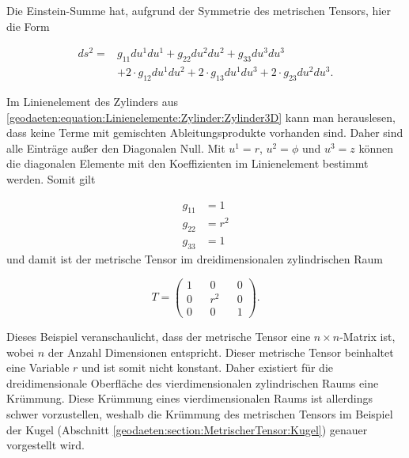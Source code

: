 Die Einstein-Summe hat, aufgrund der Symmetrie des metrischen Tensors, hier die Form

\begin{equation}
\begin{aligned}
	ds^2 = &g_{11}  du^1  du^1 + g_{22}  du^2  du^2 + g_{33}  du^3  du^3 \nonumber \\
	&+ 2 \cdot g_{12}  du^1  du^2 + 2 \cdot g_{13}  du^1  du^3 + 2 \cdot g_{23}  du^2  du^3 .
\end{aligned} 
	\label{geodaeten:equation:MetrischerTensor:Kartesisch:EinsteinSumme3D}
\end{equation}

Im Linienelement des Zylinders aus \eqref{geodaeten:equation:Linienelemente:Zylinder:Zylinder3D} kann man herauslesen, dass keine Terme mit gemischten Ableitungsprodukte vorhanden sind.
Daher sind alle Einträge außer den Diagonalen Null.
Mit $u^1 = r$, $u^2 = \phi$ und $u^3 = z$  können die diagonalen Elemente mit den Koeffizienten im Linienelement bestimmt werden. 
Somit gilt

\begin{equation}
	\begin{aligned}
		g_{11}  &= 1  \\
		g_{22}  &= r^2 \\
		g_{33}  &= 1  
	\end{aligned}
\end{equation}
und damit ist der metrische Tensor im dreidimensionalen zylindrischen Raum

\begin{equation}
	T = \begin{pmatrix} 1 && 0 && 0 \\ 0 && r^2 && 0 \\ 0 && 0 && 1 \end{pmatrix} .
\end{equation}

Dieses Beispiel veranschaulicht, dass der metrische Tensor eine $n \times n$-Matrix ist, wobei $n$ der Anzahl Dimensionen entspricht.
Dieser metrische Tensor beinhaltet eine Variable $r$ und ist somit nicht konstant. 
Daher existiert für die dreidimensionale Oberfläche des vierdimensionalen zylindrischen Raums eine Krümmung.
Diese Krümmung eines vierdimensionalen Raums ist allerdings schwer vorzustellen, weshalb die Krümmung des metrischen Tensors im Beispiel der Kugel (Abschnitt \ref{geodaeten:section:MetrischerTensor:Kugel}) genauer vorgestellt wird.
